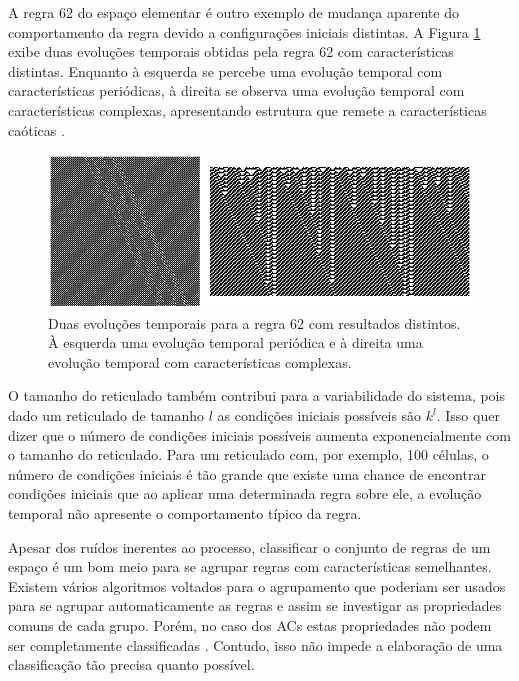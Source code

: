 \documentclass[12pt,a4paper]{report}
\begin{document}
	A regra 62 do espaço elementar é outro exemplo de mudança aparente do comportamento da regra devido a configurações iniciais distintas. A Figura \ref{fig:rule62WithiTwoInitialConditions} exibe duas evoluções temporais obtidas pela regra 62 com características distintas. Enquanto à esquerda se percebe uma evolução temporal com características periódicas, à direita se observa uma evolução temporal com características complexas, apresentando estrutura que remete a características caóticas \cite{Weifeng2014}.
	
	\begin{figure}[H]
		\centering
		\includegraphics[scale=1]{./img/ca_sample_62.png}
		\caption{Duas evoluções temporais para a regra 62 com resultados distintos. À esquerda uma evolução temporal periódica e à direita uma evolução temporal com características complexas.}
		\label{fig:rule62WithiTwoInitialConditions}
	\end{figure}
	
	O tamanho do reticulado também contribui para a variabilidade do sistema, pois dado um reticulado de tamanho $l$ as condições iniciais possíveis são $k^l$. Isso quer dizer que o número de condições iniciais possíveis aumenta exponencialmente com o tamanho do reticulado. Para um reticulado com, por exemplo, 100 células, o número de condições iniciais é tão grande que existe uma chance de encontrar condições iniciais que ao aplicar uma determinada regra sobre ele, a evolução temporal não apresente o comportamento típico da regra.
	
	Apesar dos ruídos inerentes ao processo, classificar o conjunto de regras de um espaço é um bom meio para se agrupar regras com características semelhantes. Existem vários algoritmos voltados para o agrupamento que poderiam ser usados para se agrupar automaticamente as regras e assim se investigar as propriedades comuns de cada grupo. Porém, no caso dos ACs estas propriedades não podem ser completamente classificadas \cite{Culik:1988:UCC:45269.45271}. Contudo, isso não impede a elaboração de uma classificação tão precisa quanto possível.
	
\end{document}
